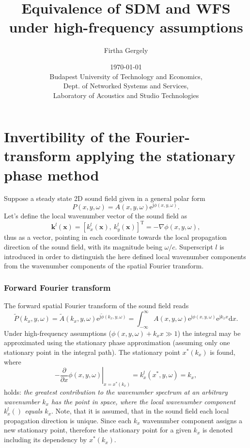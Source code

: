 \documentclass[12pt,a4paper]{article}
\title{Equivalence of SDM and WFS under high-frequency assumptions}
\date{\today \\
Budapest University of Technology and Economics, \\ Dept. of Networked Systems and Services, \\ Laboratory of Acoustics and Studio Technologies}
\author{Firtha Gergely}
\newcommand{\td}{\mathrm{d}}
\newcommand{\te}{\mathrm{e}}
\newcommand{\ti}{\mathrm{j}}
\newcommand{\vx}{\mathbf{x}}
\begin{document}
\maketitle

\section{Invertibility of the Fourier-transform applying the stationary phase method}

Suppose a steady state 2D sound field given in a general polar form
\begin{equation}
P(x,y,\omega) = A(x,y,\omega) \te^{\ti \phi(x,y,\omega)}.
\end{equation}
Let's define the local wavenumber vector of the sound field as
\begin{equation}
\mathbf{k}^l(\vx) = [k_x^l(\vx),\ k_y^l(\vx)]^{\mathrm{T}} = -\nabla \phi(x,y,\omega),
\end{equation}
thus as a vector, pointing in each coordinate towards the local propagation direction of the sound field, with its magnitude being $\omega/c$. Superscript $l$ is introduced in order to distinguish the here defined local wavenumber components from the wavenumber components of the spatial Fourier transform.

\subsubsection*{Forward Fourier transform}
The forward spatial Fourier transform of the sound field reads
\begin{equation}
\tilde{P}(k_x,y,\omega) = \tilde{A}(k_x,y,\omega)\te^{\ti \tilde{\phi}(k_x,y,\omega)} = 
\int_{-\infty}^{\infty} A(x,y,\omega)\te^{\ti \phi(x,y,\omega)} \te^{\ti k_x x} \td x.
\end{equation}
Under high-frequency assumptions ($\phi(x,y,\omega)+k_x x \gg 1$) the integral may be approximated using the stationary phase approximation (assuming only one stationary point in the integral path). The stationary point $x^*(k_x)$ is found, where
\begin{equation}
- \left. \frac{\partial}{\partial x} \phi(x,y,\omega) \right|_{x = x^*(k_x)} = k_x^l(x^*,y,\omega) = k_x,
\end{equation}
holds: \emph{the greatest contribution to the wavenumber spectrum at an arbitrary wavenumber $k_x$ has the point in space, where the local wavenumber component $k_x^l()$ equals $k_x$}. Note, that it is assumed, that in the sound field each local propagation direction is unique.
Since each $k_x$ wavenumber component assigns a new stationary point, therefore the stationary point for a given $k_x$ is denoted including its dependency by $x^*(k_x)$.
\end{document}
